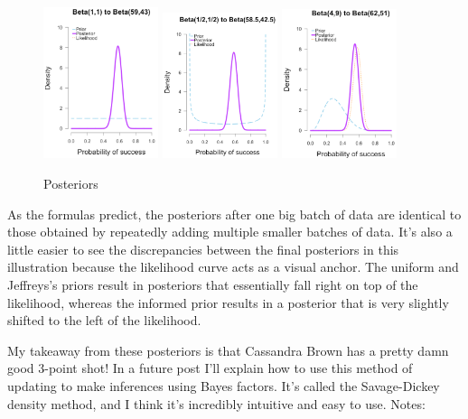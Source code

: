 \begin{figure}[h]
    \centering
\includegraphics[width=0.3\textwidth]{pic/p05c03-snip12-1.png}
\includegraphics[width=0.3\textwidth]{pic/p05c03-snip12-2.png}
\includegraphics[width=0.3\textwidth]{pic/p05c03-snip12-3.png}
    \caption{Posteriors}
    \label{fig:p05c03-snip12}
\end{figure}


As the formulas predict, the posteriors after one big batch of data are identical to those obtained by repeatedly adding multiple smaller batches of data. It's also a little easier to see the discrepancies between the final posteriors in this illustration because the likelihood curve acts as a visual anchor. The uniform and Jeffreys's priors result in posteriors that essentially fall right on top of the likelihood, whereas the informed prior results in a posterior that is very slightly shifted to the left of the likelihood.

My takeaway from these posteriors is that Cassandra Brown has a pretty damn good 3-point shot! In a future post I'll explain how to use this method of updating to make inferences using Bayes factors. It's called the Savage-Dickey density method, and I think it's incredibly intuitive and easy to use.
Notes:

